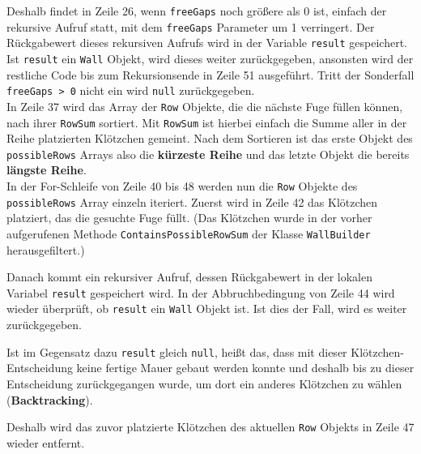 \documentclass[a4paper,12pt]{article}
\newcommand{\code}{\texttt}
\begin{document}
Deshalb findet in Zeile 26, wenn \code{freeGaps} noch größere als 0 ist, einfach der rekursive Aufruf statt, mit dem \code{freeGaps} Parameter um 1 verringert. Der Rückgabewert dieses rekursiven Aufrufs wird in der Variable \code{result} gespeichert. Ist \code{result} ein \code{Wall} Objekt, wird dieses weiter zurückgegeben, ansonsten wird der restliche Code bis zum Rekursionsende in Zeile 51 ausgeführt.
Tritt der Sonderfall \code{freeGaps > 0} nicht ein wird \code{null} zurückgegeben.
\\[0.4cm]
In Zeile 37 wird das Array der \code{Row} Objekte, die die nächste Fuge füllen können, nach ihrer \code{RowSum} sortiert. Mit \code{RowSum} ist hierbei einfach die Summe aller in der Reihe platzierten Klötzchen gemeint.
Nach dem Sortieren ist das erste Objekt des \code{possibleRows} Arrays also die \textbf{kürzeste Reihe} und das letzte Objekt die bereits \textbf{längste Reihe}.
\\[0.4cm]
In der For-Schleife von Zeile 40 bis 48 werden nun die \code{Row} Objekte des \code{possibleRows} Array einzeln iteriert.
Zuerst wird in Zeile 42 das Klötzchen platziert, das die gesuchte Fuge füllt. (Das Klötzchen wurde in der vorher aufgerufenen Methode \code{ContainsPossibleRowSum} der Klasse \code{WallBuilder} herausgefiltert.)

Danach kommt ein rekursiver Aufruf, dessen Rückgabewert in der lokalen Variabel \code{result} gespeichert wird. In der Abbruchbedingung von Zeile 44 wird wieder überprüft, ob \code{result} ein \code{Wall} Objekt ist. Ist dies der Fall, wird es weiter zurückgegeben.

Ist im Gegensatz dazu \code{result} gleich \code{null}, heißt das, dass mit dieser Klötzchen-Entscheidung keine fertige Mauer gebaut werden konnte und deshalb bis zu dieser Entscheidung zurückgegangen wurde, um dort ein anderes Klötzchen zu wählen (\textbf{Backtracking}).

Deshalb wird das zuvor platzierte Klötzchen des aktuellen \code{Row} Objekts in Zeile 47 wieder entfernt.
\end{document}
